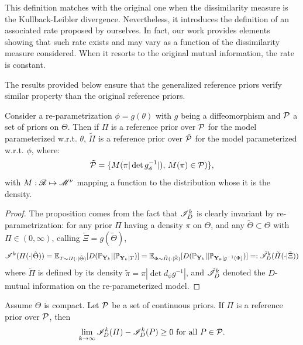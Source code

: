 This definition matches with the original one when the dissimilarity measure is the Kullback-Leibler divergence. Nevertheless, it introduces the definition of an associated rate proposed by ourselves. In fact, our
work provides elements showing that such rate exists and may vary as a function of the dissimilarity measure
considered. When it resorts to the original mutual information, the rate is constant.

The results provided below ensure that the generalized reference priors verify similar property than the original reference priors.







\begin{prop}
    Consider a re-parametrization $\phi=g(\theta)$ with $g$ being a diffeomorphism and $\mathcal{P}$ a set of priors on $\Theta$.
    Then if $\varPi$ is  a reference prior over $\mathcal{P}$ for the model parameterized w.r.t. $\theta$, $\tilde{\varPi}$ is a reference prior over $\tilde{\mathcal{P}}$ for the model parameterized w.r.t. $\phi$, where: 
    \begin{equation}
        \tilde{\mathcal{P}} = \{ M(\pi |\det g_\phi^{-1}|),\,M(\pi)\in\mathcal{P} ) \},
    \end{equation}
    with $M:\mathscr{R}\mapsto\mathscr{M}^\nu$ mapping a function to the distribution whose it is the density.
\end{prop}

\begin{proof}
    The proposition comes from the fact that $\mathscr{I}^k_D$ is
    clearly invariant by re-parametrization: for any prior $\varPi$ having a density $\pi$ on $\Theta$, and any $\tilde\Theta\subset\Theta$ with $\varPi\in(0,\infty)$, calling $\tilde\Xi = g(\tilde\Theta) $,
        \begin{equation}
            \mathscr{I}^k(\varPi(\cdot|\tilde\Theta)) = \mathbb{E}_{T\sim\varPi(\cdot|\tilde\Theta)}[D(\mathbb{P}_{\mathbf{Y}_k}||\mathbb{P}_{\mathbf{Y}_k|T} )] = \mathbb{E}_{\Phi\sim\tilde\varPi(\cdot|\tilde\Xi)} [D(\mathbb{P}_{\mathbf{Y}_k}||\mathbb{P}_{\mathbf{Y}_k|g^{-1}(\Phi)} )] =: \tilde{\mathscr{I}}^k_D(\tilde\varPi(\cdot|\tilde\Xi))
        \end{equation}
    where $\tilde\varPi$ is defined by its density $\tilde\pi = \pi|\det d_\phi g^{-1}|$, and $\tilde{\mathscr{I}}^k_D$ denoted the $D$-mutual information on the re-parameterized model.
\end{proof}

\begin{prop}
    Assume $\Theta$ is compact. Let $\mathcal{P}$ be a set of continuous priors. If $\varPi$ is a reference prior over $\mathcal{P}$, then
        \begin{equation}
            \lim_{k\rightarrow\infty} \mathscr{I}_D^k(\varPi) -\mathscr{I}_D^k(P) \geq0 \text{\ for all\ } P\in\mathcal{P}.
        \end{equation}
\end{prop}

